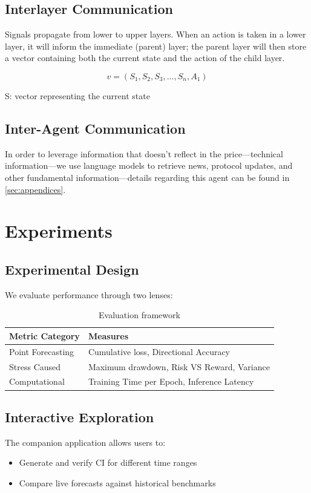 \documentclass[12pt]{article}
\begin{document}
\subsection{Interlayer Communication}
Signals propagate from lower to upper layers. When an action is taken in a lower layer, it will inform the immediate (parent) layer; the parent layer will then store a vector containing both the current state and the action of the child layer.

\begin{equation}
    v = (S_1, S_2, S_3, ..., S_n, A_1)
\end{equation}

S: vector representing the current state

\subsection{Inter-Agent Communication}

In order to leverage information that doesn't reflect in the price---technical information---we use language models to retrieve news, protocol updates, and other fundamental information---details regarding this agent can be found in \ref{sec:appendices}.

\section{Experiments}
\label{sec:experiments}

\subsection{Experimental Design}
We evaluate performance through two lenses:

\begin{table}[H]
\centering
\caption{Evaluation framework}
\label{tab:eval}
\begin{tabular}{ll}
\toprule
\textbf{Metric Category} & \textbf{Measures} \\
\midrule
Point Forecasting & Cumulative loss, Directional Accuracy \\
Stress Caused & Maximum drawdown, Risk VS Reward, Variance \\
Computational & Training Time per Epoch, Inference Latency \\
\bottomrule
\end{tabular}
\end{table}

\subsection{Interactive Exploration}
The companion application allows users to:
\begin{itemize}
\item Generate and verify CI for different time ranges
\item Compare live forecasts against historical benchmarks
\end{itemize}
\end{document}
